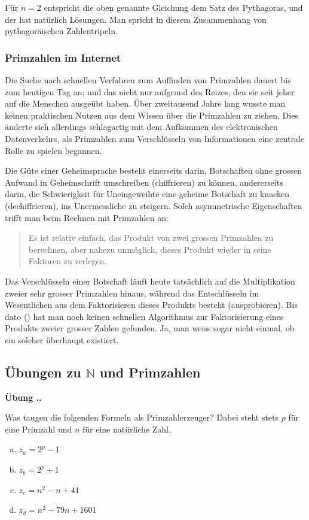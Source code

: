 \documentclass[%
11pt,%
twoside,%
titlepage,%
swissgerman,%
headsepline%
]{scrartcl}
\newcommand{\faEyeLightGray}{\textcolor{lightgray}{\faEye}} %
\newcommand{\definition}[1]{\colorbox{emerald}{#1}}
\theoremstyle{definition}
\theoremstyle{plain}
\newcommand{\concatueb}[1]{ueb:#1}%
\newcommand{\concatlsg}[1]{lsg:#1}%
\newcounter{uebcounter}[section]
\renewcommand{\theuebcounter}{\thesection.\arabic{uebcounter}}  %
\newenvironment{uebenv}[1]{%
    \refstepcounter{uebcounter}
    \par\noindent\textbf{Übung \theuebcounter.}%
    \label{\concatueb{#1}}\hfill\hyperref[\concatlsg{#1}]{\faEyeLightGray}\par
}{%
    \par
}
\begin{document}
    Für $n=2$ entspricht die oben genannte Gleichung dem Satz des Pythagoras, und der hat natürlich Lösungen. Man spricht in diesem Zusammenhang von \definition{pythagoräischen Zahlentripeln}.

\subsubsection{Primzahlen im Internet}

Die Suche nach schnellen Verfahren zum Auffinden von Primzahlen dauert bis zum heutigen Tag an; und das nicht nur aufgrund des Reizes, den sie seit jeher auf die Menschen ausgeübt haben. Über zweitausend Jahre lang wusste man keinen praktischen Nutzen aus dem Wissen über die Primzahlen zu ziehen. Dies änderte sich allerdings schlagartig mit dem Aufkommen des elektronischen Datenverkehrs, als Primzahlen zum Verschlüsseln von Informationen eine zentrale Rolle zu spielen begannen.

Die Güte einer Geheimsprache besteht einerseits darin, Botschaften ohne grossen Aufwand in Geheimschrift umschreiben (chiffrieren) zu können, andererseits darin, die Schwierigkeit für Uneingeweihte eine geheime Botschaft zu knacken (dechiffrieren), ins Unermessliche zu steigern. Solch asymmetrische Eigenschaften trifft man beim Rechnen mit Primzahlen an:

\begin{quote}
Es ist relativ einfach, das Produkt von zwei grossen Primzahlen zu berechnen, aber nahezu unmöglich, dieses Produkt wieder in seine Faktoren zu zerlegen.
\end{quote}

Das Verschlüsseln einer Botschaft läuft heute tatsächlich auf die Multiplikation zweier sehr grosser Primzahlen hinaus, während das Entschlüsseln im Wesentlichen aus dem Faktorisieren dieses Produkts besteht (ausprobieren).
Bis dato (\the\year) hat man noch keinen schnellen Algorithmus zur Faktorisierung eines Produkts zweier grosser Zahlen gefunden. Ja, man weiss sogar nicht einmal, ob ein solcher überhaupt existiert.

\subsection{Übungen zu $\mathbb{N}$ und Primzahlen}

\begin{uebenv}{primzahlformel}
Was taugen die folgenden Formeln als Primzahlerzeuger? Dabei steht stets $p$ für eine Primzahl und $n$ für eine natürliche Zahl.

    \begin{enumerate}[a)]
        \item $z_a=2^p-1$
        \item $z_b=2^p+1$
        \item $z_c=n^2-n+41$
        \item $z_d=n^2-79n+1601$
    \end{enumerate}
\end{uebenv}
\end{document}
